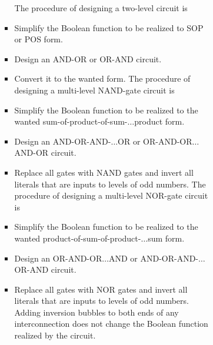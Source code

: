 \documentclass[a4paper,12pt]{article}
\begin{document}
\begin{itemize}
\begin{itemize}
\begin{itemize}
\begin{itemize}
\begin{itemize}
\begin{itemize}
\begin{itemize}
The procedure of designing a two-level circuit is
\ben
\item Simplify the Boolean function to be realized to SOP or POS form.
\item Design an AND-OR or OR-AND circuit.
\item Convert it to the wanted form.
\een
{}
The procedure of designing a multi-level NAND-gate circuit is
\ben
\item Simplify the Boolean function to be realized to the wanted sum-of-product-of-sum-$\ldots$product form.
\item Design an AND-OR-AND-$\ldots$OR or OR-AND-OR$\ldots$AND-OR circuit.
\item Replace all gates with NAND gates and invert all literals that are inputs to levels of odd numbers.
\een
The procedure of designing a multi-level NOR-gate circuit is
\ben
\item Simplify the Boolean function to be realized to the wanted product-of-sum-of-product-$\ldots$sum form.
\item Design an OR-AND-OR$\ldots$AND or AND-OR-AND-$\ldots$OR-AND circuit.
\item Replace all gates with NOR gates and invert all literals that are inputs to levels of odd numbers.
\een
{}
Adding inversion bubbles to both ends of any interconnection does not change the Boolean function realized by the circuit.


\end{itemize}
\end{itemize}
\end{itemize}
\end{itemize}
\end{itemize}
\end{itemize}
\end{itemize}
\end{document}
